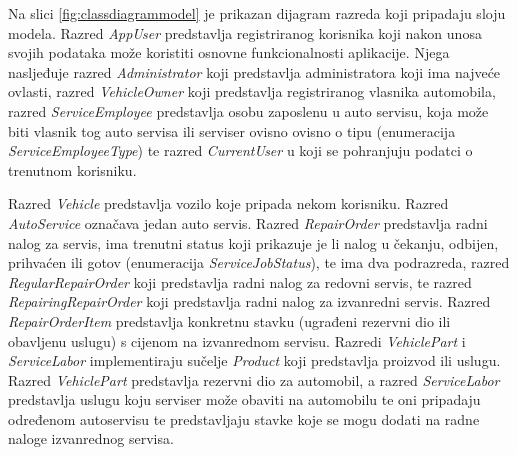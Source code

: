 		Na slici \ref{fig:classdiagrammodel} je prikazan dijagram razreda koji pripadaju sloju modela. Razred \textit{AppUser} predstavlja registriranog korisnika koji nakon unosa svojih podataka može koristiti osnovne funkcionalnosti aplikacije. Njega nasljeđuje razred \textit{Administrator} koji predstavlja administratora koji ima najveće ovlasti, razred \textit{VehicleOwner} koji predstavlja registriranog vlasnika automobila, razred \textit{ServiceEmployee} predstavlja osobu zaposlenu u auto servisu, koja može biti vlasnik tog auto servisa ili serviser ovisno ovisno o tipu (enumeracija \textit{ServiceEmployeeType}) te razred \textit{CurrentUser} u koji se pohranjuju podatci o trenutnom korisniku. 
		
		Razred \textit{Vehicle} predstavlja vozilo koje pripada nekom korisniku. Razred \textit{AutoService} označava jedan auto servis. Razred \textit{RepairOrder} predstavlja radni nalog za servis, ima trenutni status koji prikazuje je li nalog u čekanju, odbijen, prihvaćen ili gotov (enumeracija \textit{ServiceJobStatus}), te ima dva podrazreda, razred \textit{RegularRepairOrder} koji predstavlja radni nalog za redovni servis, te razred \textit{RepairingRepairOrder} koji predstavlja radni nalog za izvanredni servis. Razred \textit{RepairOrderItem} predstavlja konkretnu stavku (ugrađeni rezervni dio ili obavljenu uslugu) s cijenom na izvanrednom servisu. Razredi \textit{VehiclePart} i \textit{ServiceLabor} implementiraju sučelje \textit{Product} koji predstavlja proizvod ili uslugu. Razred \textit{VehiclePart} predstavlja rezervni dio za automobil, a razred \textit{ServiceLabor} predstavlja uslugu koju serviser može obaviti na automobilu te oni pripadaju određenom autoservisu te predstavljaju stavke koje se mogu dodati na radne naloge izvanrednog servisa.
		
